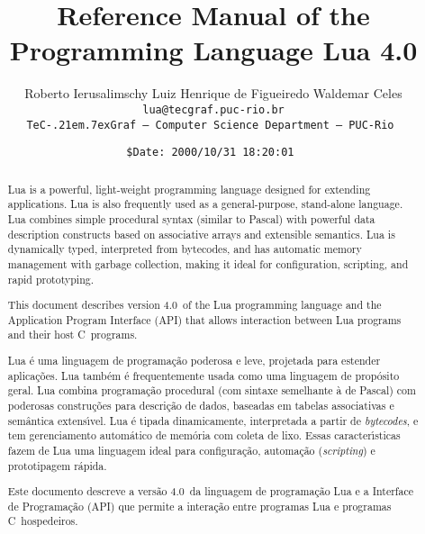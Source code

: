 \documentclass[11pt]{article}
\def\tecgraf{{\sf TeC\kern-.21em\lower.7ex\hbox{Graf}}}
\newcommand{\Version}{4.0}
\begin{document}
\title{\Large\bf Reference Manual of the Programming Language Lua \Version}

\author{%
Roberto Ierusalimschy\quad
Luiz Henrique de Figueiredo\quad
Waldemar Celes
\vspace{1.0ex}\\
\smallskip
\small\tt lua@tecgraf.puc-rio.br
\vspace{2.0ex}\\
\tecgraf\ --- Computer Science Department --- PUC-Rio
}

\date{{\small \tt\$Date: 2000/10/31 18:20:01 $ $}}

\maketitle

\pagestyle{plain}

\begin{abstract}
\noindent
Lua is a powerful, light-weight programming language
designed for extending applications.
Lua is also frequently used as a general-purpose, stand-alone language.
Lua combines simple procedural syntax
(similar to Pascal)
with
powerful data description constructs
based on associative arrays and extensible semantics.
Lua is
dynamically typed,
interpreted from bytecodes,
and has automatic memory management with garbage collection,
making it ideal for
configuration,
scripting,
and
rapid prototyping.

This document describes version \Version\ of the Lua programming language
and the Application Program Interface (API)
that allows interaction between Lua programs and their host C~programs.
\end{abstract}

\def\abstractname{Resumo}
\begin{abstract}
\noindent
Lua \'e uma linguagem de programa\c{c}\~ao
poderosa e leve,
projetada para estender aplica\c{c}\~oes.
Lua tamb\'em \'e frequentemente usada como uma linguagem de prop\'osito geral.
Lua combina programa\c{c}\~ao procedural
(com sintaxe semelhante \`a de Pascal)
com
poderosas constru\c{c}\~oes para descri\c{c}\~ao de dados,
baseadas em tabelas associativas e sem\^antica extens\'\i vel.
Lua \'e
tipada dinamicamente,
interpretada a partir de \emph{bytecodes},
e tem gerenciamento autom\'atico de mem\'oria com coleta de lixo.
Essas caracter\'{\i}sticas fazem de Lua uma linguagem ideal para
configura\c{c}\~ao,
automa\c{c}\~ao (\emph{scripting})
e prototipagem r\'apida.

Este documento descreve a vers\~ao \Version\ da linguagem de
programa\c{c}\~ao Lua e a Interface de Programa\c{c}\~ao (API) que permite
a intera\c{c}\~ao entre programas Lua e programas C~hospedeiros.
\end{abstract}
\end{document}
